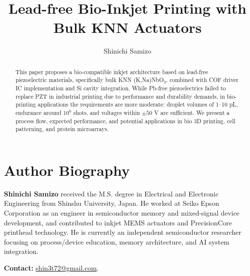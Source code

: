 \documentclass[conference]{IEEEtran}
\title{Lead-free Bio-Inkjet Printing with Bulk KNN Actuators}
\author{Shinichi Samizo}
\begin{document}
\maketitle

\begin{abstract}
This paper proposes a bio-compatible inkjet architecture based on
lead-free piezoelectric materials, specifically bulk KNN (K,Na)NbO$_3$,
combined with COF driver IC implementation and Si cavity integration.
While Pb-free piezoelectrics failed to replace PZT in industrial
printing due to performance and durability demands, in bio-printing
applications the requirements are more moderate: droplet volumes of
1--10 pL, endurance around $10^6$ shots, and voltages within $\pm50$ V
are sufficient. We present a process flow, expected performance, and
potential applications in bio 3D printing, cell patterning, and
protein microarrays.
\end{abstract}










\section*{Author Biography}
\textbf{Shinichi Samizo} received the M.S. degree in Electrical and Electronic Engineering 
from Shinshu University, Japan. He worked at Seiko Epson Corporation as an engineer in 
semiconductor memory and mixed-signal device development, and contributed to inkjet MEMS 
actuators and PrecisionCore printhead technology. He is currently an independent 
semiconductor researcher focusing on process/device education, memory architecture, and 
AI system integration. 

\textbf{Contact:} \href{mailto:shin3t72@gmail.com}{shin3t72@gmail.com}.
\end{document}
